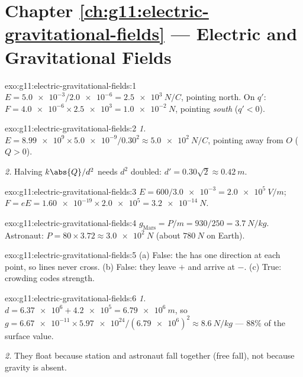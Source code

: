 \section*{Chapter \ref{ch:g11:electric-gravitational-fields} --- Electric and Gravitational Fields}

\begin{solution}{exo:g11:electric-gravitational-fields:1}
$E = \num{5.0e-3} / \num{2.0e-6} = \qty{2.5e3}{N/C}$, pointing north.
On $q'$: $F = \num{4.0e-6} \times \num{2.5e3} = \qty{1.0e-2}{N}$,
pointing \emph{south} ($q' < 0$).
\end{solution}

\begin{solution}{exo:g11:electric-gravitational-fields:2}
\emph{1.} $E = \num{8.99e9} \times \num{5.0e-9} / 0.30^2
\approx \qty{5.0e2}{N/C}$, pointing away from $O$ ($Q > 0$).

\emph{2.} Halving $k\abs{Q}/d^2$ needs $d^2$ doubled:
$d' = 0.30\sqrt{2} \approx \qty{0.42}{m}$.
\end{solution}

\begin{solution}{exo:g11:electric-gravitational-fields:3}
$E = 600 / \num{3.0e-3} = \qty{2.0e5}{V/m}$;
$F = eE = \num{1.60e-19} \times \num{2.0e5} = \qty{3.2e-14}{N}$.
\end{solution}

\begin{solution}{exo:g11:electric-gravitational-fields:4}
$g_{\text{Mars}} = P/m = 930/250 = \qty{3.7}{N/kg}$. Astronaut:
$P = 80 \times 3.72 \approx \qty{3.0e2}{N}$ (about $\qty{780}{N}$ on
Earth).
\end{solution}

\begin{solution}{exo:g11:electric-gravitational-fields:5}
(a) False: the  has one direction at each point, so lines never
cross. (b) False: they leave $+$ and arrive at $-$. (c) True: crowding
codes strength.
\end{solution}

\begin{solution}{exo:g11:electric-gravitational-fields:6}
\emph{1.} $d = \num{6.37e6} + \num{4.2e5} = \qty{6.79e6}{m}$, so
$g = \num{6.67e-11} \times \num{5.97e24} / (\num{6.79e6})^2
\approx \qty{8.6}{N/kg}$ --- $88\%$ of the surface value.

\emph{2.} They float because station and astronaut fall together (free
fall), not because gravity is absent.
\end{solution}

